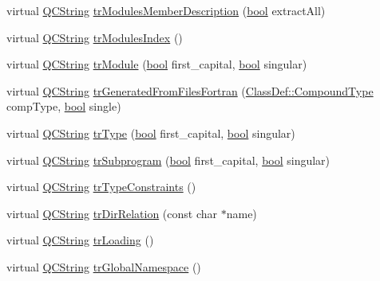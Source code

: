 \begin{DoxyCompactItemize}
\item 
virtual \hyperlink{class_q_c_string}{Q\+C\+String} \hyperlink{class_translator_danish_aa26e0b1eca8077c9c59712c5f09887fb}{tr\+Modules\+Member\+Description} (\hyperlink{qglobal_8h_a1062901a7428fdd9c7f180f5e01ea056}{bool} extract\+All)
\item 
virtual \hyperlink{class_q_c_string}{Q\+C\+String} \hyperlink{class_translator_danish_a60f4695411b83cb469b4ea92f69f136d}{tr\+Modules\+Index} ()
\item 
virtual \hyperlink{class_q_c_string}{Q\+C\+String} \hyperlink{class_translator_danish_ad668d61e95181ea0750d1e5359ce134f}{tr\+Module} (\hyperlink{qglobal_8h_a1062901a7428fdd9c7f180f5e01ea056}{bool} first\+\_\+capital, \hyperlink{qglobal_8h_a1062901a7428fdd9c7f180f5e01ea056}{bool} singular)
\item 
virtual \hyperlink{class_q_c_string}{Q\+C\+String} \hyperlink{class_translator_danish_a9112914f46dc2688ba460797d08c9793}{tr\+Generated\+From\+Files\+Fortran} (\hyperlink{class_class_def_ae70cf86d35fe954a94c566fbcfc87939}{Class\+Def\+::\+Compound\+Type} comp\+Type, \hyperlink{qglobal_8h_a1062901a7428fdd9c7f180f5e01ea056}{bool} single)
\item 
virtual \hyperlink{class_q_c_string}{Q\+C\+String} \hyperlink{class_translator_danish_ad824f35152e985879e8c48603393687b}{tr\+Type} (\hyperlink{qglobal_8h_a1062901a7428fdd9c7f180f5e01ea056}{bool} first\+\_\+capital, \hyperlink{qglobal_8h_a1062901a7428fdd9c7f180f5e01ea056}{bool} singular)
\item 
virtual \hyperlink{class_q_c_string}{Q\+C\+String} \hyperlink{class_translator_danish_a2506998cfc0654bed4d5575106697dd9}{tr\+Subprogram} (\hyperlink{qglobal_8h_a1062901a7428fdd9c7f180f5e01ea056}{bool} first\+\_\+capital, \hyperlink{qglobal_8h_a1062901a7428fdd9c7f180f5e01ea056}{bool} singular)
\item 
virtual \hyperlink{class_q_c_string}{Q\+C\+String} \hyperlink{class_translator_danish_a170dceaf0c66de4a6057aef089fe8102}{tr\+Type\+Constraints} ()
\item 
virtual \hyperlink{class_q_c_string}{Q\+C\+String} \hyperlink{class_translator_danish_af1ed1ccdc6ae2f20e8134db08d7c051e}{tr\+Dir\+Relation} (const char $\ast$name)
\item 
virtual \hyperlink{class_q_c_string}{Q\+C\+String} \hyperlink{class_translator_danish_a4146afb518e742269190704e3c8fc6ae}{tr\+Loading} ()
\item 
virtual \hyperlink{class_q_c_string}{Q\+C\+String} \hyperlink{class_translator_danish_ac29a78886ffbbe26155c998d6a15b82b}{tr\+Global\+Namespace} ()

\end{DoxyCompactItemize}
